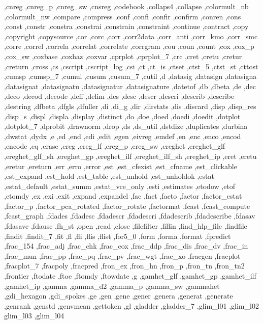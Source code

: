 {{    ,cnreg ,cnreg_p ,cnreg_sw ,cnsreg ,codebook ,collaps4 ,collapse
    ,colormult_nb ,colormult_nw ,compare ,compress ,conf ,confi
    ,confir ,confirm ,conren ,cons ,const ,constr ,constra ,constrai
    ,constrain ,constraint ,continue ,contract ,copy ,copyright
    ,copysource ,cor ,corc ,corr ,corr2data ,corr_anti ,corr_kmo
    ,corr_smc ,corre ,correl ,correla ,correlat ,correlate ,corrgram
    ,cou ,coun ,count ,cox ,cox_p ,cox_sw ,coxbase ,coxhaz ,coxvar
    ,cprplot ,cprplot_7 ,crc ,cret ,cretu ,cretur ,creturn ,cross ,cs
    ,cscript ,cscript_log ,csi ,ct ,ct_is ,ctset ,ctst_5 ,ctst_st
    ,cttost ,cumsp ,cumsp_7 ,cumul ,cusum ,cusum_7 ,cutil ,d ,datasig
    ,datasign ,datasigna ,datasignat ,datasignatu ,datasignatur
    ,datasignature ,datetof ,db ,dbeta ,de ,dec ,deco ,decod ,decode
    ,deff ,delim ,des ,desc ,descr ,descri ,describ ,describe ,destring
    ,dfbeta ,dfgls ,dfuller ,di ,di_g ,dir ,dirstats ,dis ,discard
    ,disp ,disp_res ,disp_s ,displ ,displa ,display ,distinct ,do
    ,doe ,doed ,doedi ,doedit ,dotplot ,dotplot_7 ,dprobit ,drawnorm
    ,drop ,ds ,ds_util ,dstdize ,duplicates ,durbina ,dwstat ,dydx ,e
    ,ed ,end ,edi ,edit ,egen ,eivreg ,emdef ,en ,enc ,enco ,encod ,encode
    ,eq ,erase ,ereg ,ereg_lf ,ereg_p ,ereg_sw ,ereghet ,ereghet_glf
    ,ereghet_glf_sh ,ereghet_gp ,ereghet_ilf ,ereghet_ilf_sh ,ereghet_ip
    ,eret ,eretu ,eretur ,ereturn ,err ,erro ,error ,est ,est_cfexist
    ,est_cfname ,est_clickable ,est_expand ,est_hold ,est_table
    ,est_unhold ,est_unholdok ,estat ,estat_default ,estat_summ
    ,estat_vce_only ,esti ,estimates ,etodow ,etof ,etomdy ,ex ,exi
    ,exit ,expand ,expandcl ,fac ,fact ,facto ,factor ,factor_estat
    ,factor_p ,factor_pca_rotated ,factor_rotate ,factormat ,fcast
    ,fcast_compute ,fcast_graph ,fdades ,fdadesc ,fdadescr ,fdadescri
    ,fdadescrib ,fdadescribe ,fdasav ,fdasave ,fdause ,fh_st
    ,open ,read ,close ,filefilter ,fillin
    ,find_hlp_file ,findfile ,findit ,findit_7 ,fit ,fl ,fli ,flis
    ,flist ,for5_0 ,form ,forma ,format ,fpredict ,frac_154 ,frac_adj
    ,frac_chk ,frac_cox ,frac_ddp ,frac_dis ,frac_dv ,frac_in ,frac_mun
    ,frac_pp ,frac_pq ,frac_pv ,frac_wgt ,frac_xo ,fracgen ,fracplot
    ,fracplot_7 ,fracpoly ,fracpred ,fron_ex ,fron_hn ,fron_p ,fron_tn
    ,fron_tn2 ,frontier ,ftodate ,ftoe ,ftomdy ,ftowdate ,g ,gamhet_glf
    ,gamhet_gp ,gamhet_ilf ,gamhet_ip ,gamma ,gamma_d2 ,gamma_p
    ,gamma_sw ,gammahet ,gdi_hexagon ,gdi_spokes ,ge ,gen ,gene ,gener
    ,genera ,generat ,generate ,genrank ,genstd ,genvmean ,gettoken
    ,gl ,gladder ,gladder_7 ,glim_l01 ,glim_l02 glim_l03 ,glim_l04
}}

